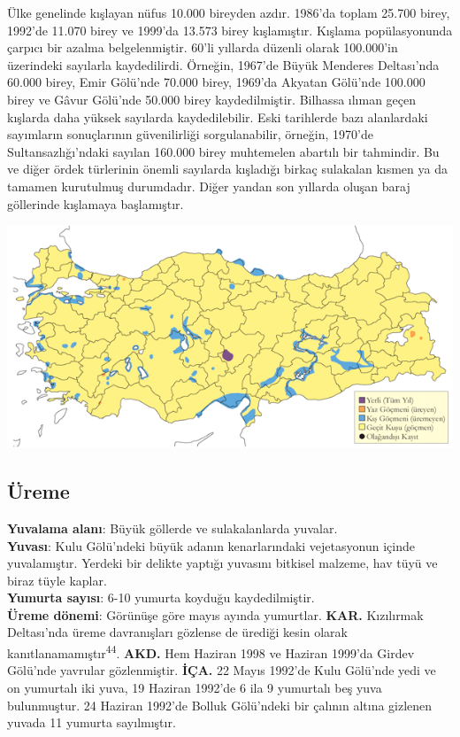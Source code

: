 \documentclass[
  letterpaper,
  DIV=11,
  numbers=noendperiod]{scrreprt}
\begin{document}
Ülke genelinde kışlayan nüfus 10.000 bireyden azdır. 1986'da toplam
25.700 birey, 1992'de 11.070 birey ve 1999'da 13.573 birey kışlamıştır.
Kışlama popülasyonunda çarpıcı bir azalma belgelenmiştir. 60'li yıllarda
düzenli olarak 100.000'in üzerindeki sayılarla kaydedilirdi. Örneğin,
1967'de Büyük Menderes Deltası'nda 60.000 birey, Emir Gölü'nde 70.000
birey, 1969'da Akyatan Gölü'nde 100.000 birey ve Gâvur Gölü'nde 50.000
birey kaydedilmiştir. Bilhassa ılıman geçen kışlarda daha yüksek
sayılarda kaydedilebilir. Eski tarihlerde bazı alanlardaki sayımların
sonuçlarının güvenilirliği sorgulanabilir, örneğin, 1970'de
Sultansazlığı'ndaki sayılan 160.000 birey muhtemelen abartılı bir
tahmindir. Bu ve diğer ördek türlerinin önemli sayılarda kışladığı
birkaç sulakalan kısmen ya da tamamen kurutulmuş durumdadır. Diğer
yandan son yıllarda oluşan baraj göllerinde kışlamaya başlamıştır.

\includegraphics{images/harita_Page_018.png}

\hypertarget{uxfcreme-17}{%
\subsection{\texorpdfstring{\textbf{Üreme}}{Üreme}}\label{uxfcreme-17}}

\textbf{Yuvalama alanı}: Büyük göllerde ve sulakalanlarda yuvalar.\\
\textbf{Yuvası}: Kulu Gölü'ndeki büyük adanın kenarlarındaki
vejetasyonun içinde yuvalamıştır. Yerdeki bir delikte yaptığı yuvasını
bitkisel malzeme, hav tüyü ve biraz tüyle kaplar.\\
\textbf{Yumurta sayısı}: 6-10 yumurta koyduğu kaydedilmiştir.\\
\textbf{Üreme dönemi}: Görünüşe göre mayıs ayında yumurtlar.
\textbf{KAR.} Kızılırmak Deltası'nda üreme davranışları gözlense de
ürediği kesin olarak kanıtlanamamıştır\textsuperscript{44}.
\textbf{AKD.} Hem Haziran 1998 ve Haziran 1999'da Girdev Gölü'nde
yavrular gözlenmiştir. \textbf{İÇA.} 22 Mayıs 1992'de Kulu Gölü'nde yedi
ve on yumurtalı iki yuva, 19 Haziran 1992'de 6 ila 9 yumurtalı beş yuva
bulunmuştur. 24 Haziran 1992'de Bolluk Gölü'ndeki bir çalının altına
gizlenen yuvada 11 yumurta sayılmıştır.
\end{document}
